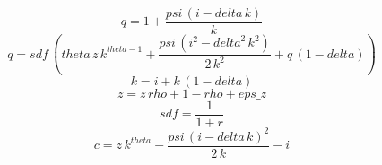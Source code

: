 \begin{dmath}
{q}=1+\frac{{psi}\, \left({i}-{delta}\, {k}\right)}{{k}}
\end{dmath}
\begin{dmath}
{q}={sdf}\, \left({theta}\, {z}\, {k}^{{theta}-1}+\frac{{psi}\, \left({i}^{2}-{delta}^{2}\, {k}^{2}\right)}{2\, {k}^{2}}+{q}\, \left(1-{delta}\right)\right)
\end{dmath}
\begin{dmath}
{k}={i}+{k}\, \left(1-{delta}\right)
\end{dmath}
\begin{dmath}
{z}={z}\, {rho}+1-{rho}+{eps\_z}
\end{dmath}
\begin{dmath}
{sdf}=\frac{1}{1+{r}}
\end{dmath}
\begin{dmath}
{c}={z}\, {k}^{{theta}}-\frac{{psi}\, \left({i}-{delta}\, {k}\right)^{2}}{2\, {k}}-{i}
\end{dmath}

